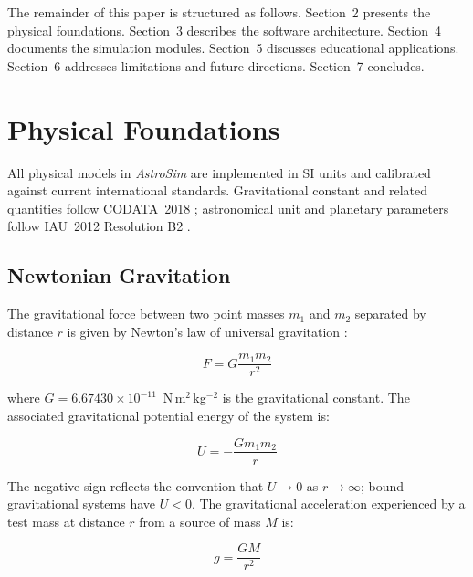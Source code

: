 \documentclass[10pt,a4paper]{article}
\begin{document}
The remainder of this paper is structured as follows.
Section~2 presents the physical foundations.
Section~3 describes the software architecture.
Section~4 documents the simulation modules.
Section~5 discusses educational applications.
Section~6 addresses limitations and future directions.
Section~7 concludes.

\section{Physical Foundations}

All physical models in \textit{AstroSim} are implemented in SI units and
calibrated against current international standards.
Gravitational constant and related quantities follow CODATA~2018
\citep{codata2018}; astronomical unit and planetary parameters follow
IAU~2012 Resolution B2 \citep{iau2012}.

\subsection{Newtonian Gravitation}

The gravitational force between two point masses $m_1$ and $m_2$ separated
by distance $r$ is given by Newton's law of universal gravitation
\citep{newton1687}:

\begin{formulabox}
\begin{equation}
F = G \frac{m_1 m_2}{r^2}
\label{eq:newton}
\end{equation}
\end{formulabox}

where $G = 6.67430 \times 10^{-11}$~N\,m$^2$\,kg$^{-2}$ is the gravitational
constant.
The associated gravitational potential energy of the system is:

\begin{equation}
U = -\frac{G m_1 m_2}{r}
\label{eq:potential}
\end{equation}

The negative sign reflects the convention that $U \to 0$ as $r \to \infty$;
bound gravitational systems have $U < 0$.
The gravitational acceleration experienced by a test mass at distance $r$
from a source of mass $M$ is:

\begin{equation}
g = \frac{GM}{r^2}
\label{eq:gravity}
\end{equation}
\end{document}
